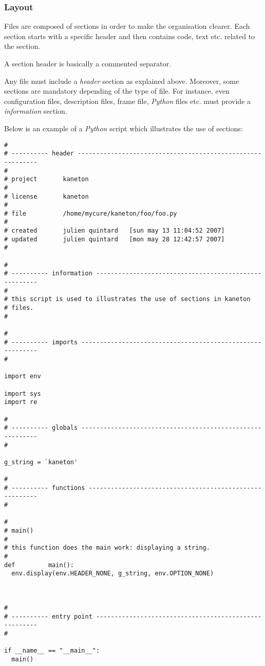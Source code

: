 
\subsubsection{Layout}

Files are composed of sections in order to make the organisation clearer.
Each section starts with a specific header and then contains code, text etc.
related to the section.

A section header is basically a commented separator.

Any file must include a \textit{header} section as explained above. Moreover,
some sections are mandatory depending of the type of file. For instance,
even configuration files, description files, frame file, \textit{Python}
files etc. must provide a \textit{information} section.

Below is an example of a \textit{Python} script which illustrates the
use of sections:

\begin{verbatim}
#
# ---------- header -----------------------------------------------------------
#
# project       kaneton
#
# license       kaneton
#
# file          /home/mycure/kaneton/foo/foo.py
#
# created       julien quintard   [sun may 13 11:04:52 2007]
# updated       julien quintard   [mon may 28 12:42:57 2007]
#

#
# ---------- information ------------------------------------------------------
#
# this script is used to illustrates the use of sections in kaneton
# files.
#

#
# ---------- imports ----------------------------------------------------------
#

import env

import sys
import re

#
# ---------- globals ----------------------------------------------------------
#

g_string = `kaneton'

#
# ---------- functions --------------------------------------------------------
#

#
# main()
#
# this function does the main work: displaying a string.
#
def			main():
  env.display(env.HEADER_NONE, g_string, env.OPTION_NONE)



#
# ---------- entry point ------------------------------------------------------
#

if __name__ == "__main__":
  main()

\end{verbatim}

